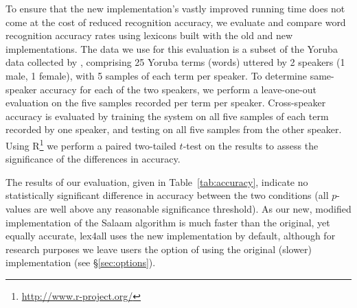 \documentclass[11pt]{article}
\begin{document}
To ensure that the new implementation's vastly improved running time does not come at the cost of reduced recognition accuracy, we evaluate and compare word recognition accuracy rates using lexicons built with the old and new implementations. The data we use for this evaluation is a subset of the Yoruba data collected by , comprising 25 Yoruba terms (words) uttered by 2 speakers (1 male, 1 female), with 5 samples of each term per speaker. 
To determine same-speaker accuracy for each of the two speakers, we perform a leave-one-out evaluation on the five samples recorded per term per speaker. 
Cross-speaker accuracy is evaluated by training the system on all five samples of each term recorded by one speaker, and testing on all five samples from the other speaker.
Using R\footnote{\url{http://www.r-project.org/}} we perform a paired two-tailed $t$-test on the results to assess the significance of the differences in accuracy.

The results of our evaluation, given in Table~\ref{tab:accuracy}, indicate no statistically significant difference in accuracy between the two conditions (all $p$-values are well above any reasonable significance threshold).  
As our new, modified implementation of the Salaam algorithm 
is much faster than the original, yet equally accurate,
lex4all uses the new implementation by default, although for research purposes we leave users the option of using the original (slower) implementation (see \S\ref{sec:options}).
\end{document}
